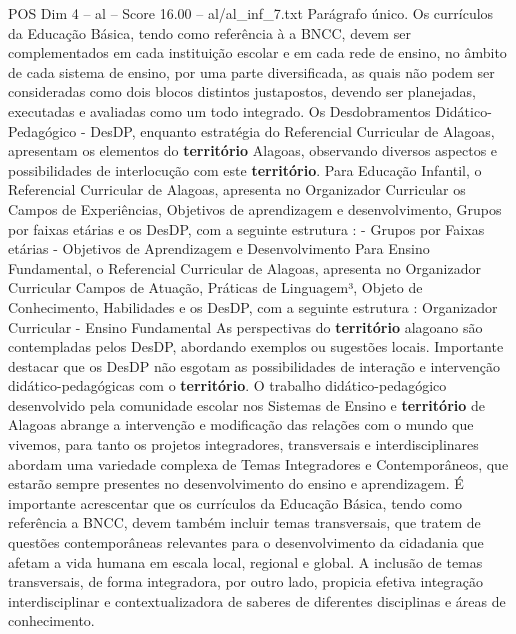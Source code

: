 \begin{textsample}{POS Dim 4 – al – Score 16.00 – al/al\_inf\_7.txt}
Parágrafo único.
Os currículos da Educação Básica, tendo como referência à a BNCC, devem ser complementados em cada instituição escolar e em cada rede de ensino, no âmbito de cada sistema de ensino, por uma parte diversificada, as quais não podem ser consideradas como dois blocos distintos justapostos, devendo ser planejadas, executadas e avaliadas como um todo integrado.
Os Desdobramentos Didático-Pedagógico - DesDP, enquanto estratégia do Referencial Curricular de Alagoas, apresentam os elementos do \textbf{território} Alagoas, observando diversos aspectos e possibilidades de interlocução com este \textbf{território}.
Para Educação Infantil, o Referencial Curricular de Alagoas, apresenta no Organizador Curricular os Campos de Experiências, Objetivos de aprendizagem e desenvolvimento, Grupos por faixas etárias e os DesDP, com a seguinte estrutura : - Grupos por Faixas etárias - Objetivos de Aprendizagem e Desenvolvimento Para Ensino Fundamental, o Referencial Curricular de Alagoas, apresenta no Organizador Curricular Campos de Atuação, Práticas de Linguagem³, Objeto de Conhecimento, Habilidades e os DesDP, com a seguinte estrutura : Organizador Curricular - Ensino Fundamental As perspectivas do \textbf{território} alagoano são contempladas pelos DesDP, abordando exemplos ou sugestões locais.
Importante destacar que os DesDP não esgotam as possibilidades de interação e intervenção didático-pedagógicas com o \textbf{território}.
O trabalho didático-pedagógico desenvolvido pela comunidade escolar nos Sistemas de Ensino e \textbf{território} de Alagoas abrange a intervenção e modificação das relações com o mundo que vivemos, para tanto os projetos integradores, transversais e interdisciplinares abordam uma variedade complexa de Temas Integradores e Contemporâneos, que estarão sempre presentes no desenvolvimento do ensino e aprendizagem.
É importante acrescentar que os currículos da Educação Básica, tendo como referência a BNCC, devem também incluir temas transversais, que tratem de questões contemporâneas relevantes para o desenvolvimento da cidadania que afetam a vida humana em escala local, regional e global.
A inclusão de temas transversais, de forma integradora, por outro lado, propicia efetiva integração interdisciplinar e contextualizadora de saberes de diferentes disciplinas e áreas de conhecimento.

\end{textsample}
